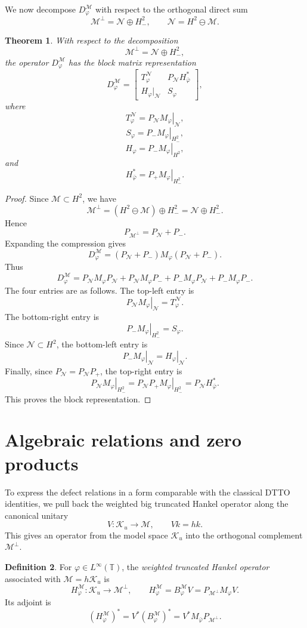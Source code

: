 \documentclass[12pt]{amsart}
\newtheorem{theorem}{Theorem}[section]
\theoremstyle{definition}
\newtheorem{definition}[theorem]{Definition}
\theoremstyle{remark}
\def \T{\mathbb{T}}
\newcommand{\clm}{\mathcal{M}}
\newcommand{\cln}{\mathcal{N}}
\newcommand{\clk}{\mathcal{K}}
\newcommand{\vp}{\varphi}
\newcommand\restr[2]{\ensuremath{\left.#1\right|_{#2}}}
\numberwithin{equation}{section}
\begin{document}
We now decompose $D_\vp^\clm$ with respect to the orthogonal direct sum
\[
\clm^\perp=\cln\oplus H^2_{-},
\qquad
\cln=H^2\ominus\clm.
\]

\begin{theorem}\label{thm:N_Hminus_block}
With respect to the decomposition
\[
\clm^\perp=\cln\oplus H^2_{-},
\]
the operator $D_\vp^\clm$ has the block matrix representation
\[
D_\vp^\clm
=
\begin{bmatrix}
T_\vp^\cln & P_\cln H_{\bar\vp}^*\\
H_\vp|_{\cln} & S_\vp
\end{bmatrix},
\]
where
\[
T_\vp^\cln=\restr{P_\cln M_\vp}{\cln},
\]
\[
S_\vp=\restr{P_{-}M_\vp}{H_{-}^2},
\]
\[
H_\vp=\restr{P_{-}M_\vp}{H^2},
\]
and
\[
H_{\bar\vp}^*=\restr{P_{+}M_\vp}{H_{-}^2}.
\]
\end{theorem}

\begin{proof}
Since $\clm\subset H^2$, we have
\[
\clm^\perp=(H^2\ominus\clm)\oplus H^2_{-}
=
\cln\oplus H^2_{-}.
\]
Hence
\[
P_{\clm^\perp}=P_\cln+P_{-}.
\]
Expanding the compression gives
\[
D_\vp^\clm
=
(P_\cln+P_{-})M_\vp(P_\cln+P_{-}).
\]
Thus
\[
D_\vp^\clm=P_\cln M_\vp P_\cln+P_\cln M_\vp P_{-} +
P_{-}M_\vp P_\cln + P_{-}M_\vp P_{-}.
\]
The four entries are as follows. The top-left entry is
\[
\restr{P_\cln M_\vp}{\cln}=T_\vp^\cln.
\]
The bottom-right entry is
\[
\restr{P_{-}M_\vp}{H_{-}^2}=S_\vp.
\]
Since $\cln\subset H^2$, the bottom-left entry is
\[
\restr{P_{-}M_\vp}{\cln}=\restr{H_\vp}{\cln}.
\]
Finally, since $P_\cln=P_\cln P_{+}$, the top-right entry is
\[
\restr{P_\cln M_\vp}{H_{-}^2} =\restr{P_\cln P_{+}M_\vp}{H_{-}^2}
=P_\cln H_{\bar\vp}^*.
\]
This proves the block representation.
\end{proof}






\section{Algebraic relations and zero products}

To express the defect relations in a form comparable with the classical DTTO identities, we pull back the weighted big truncated Hankel operator along the canonical unitary
\[
V:\clk_u\to \clm,\qquad Vk=hk.
\]
This gives an operator from the model space $\clk_u$ into the orthogonal complement $\clm^\perp$.

\begin{definition}\label{def:weighted_hankel}
For $\vp\in L^\infty(\T)$, the \emph{weighted truncated Hankel operator} associated with $\clm=h\clk_u$ is
\[
H_\vp^\clm:\clk_u\to \clm^\perp,
\qquad
H_\vp^\clm=B_\vp^\clm V
=
P_{\clm^\perp}M_\vp V.
\]
Its adjoint is
\[
(H_\vp^\clm)^*
=
V^*(B_\vp^\clm)^*
=
V^*M_{\bar\vp}P_{\clm^\perp}.
\]
\end{definition}
\end{document}
